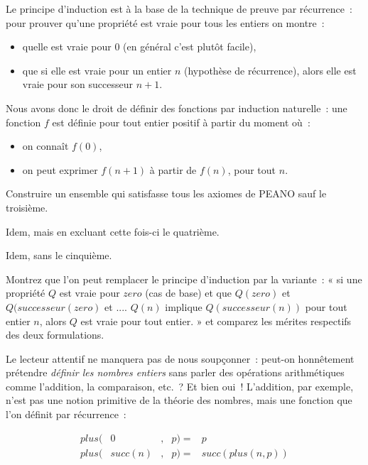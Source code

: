 Le principe d'induction est à la base de la technique de preuve par
récurrence~: pour prouver qu'une propriété est vraie pour tous les
entiers on montre~:
\begin{itemize}
	\item quelle est vraie pour $0$ (en général c'est plut\^ot
	facile), \item que si elle est vraie pour un entier $n$
	(hypothèse de récurrence), alors elle est vraie pour son
	successeur $n+1$.
\end{itemize}
Nous avons donc le droit de définir des fonctions par induction naturelle~: une fonction $f$ est définie pour tout entier positif à partir du moment o\`u~:
\begin{itemize}
\item on connaît $f(0)$,
\item on peut exprimer $f(n+1)$ à partir de $f(n)$, pour tout $n$.
\end{itemize}
\begin{exercice} Construire un ensemble qui satisfasse tous les axiomes de PEANO sauf le troisième.
\end{exercice}
\begin{exercice} Idem, mais en excluant cette fois-ci le quatrième.
\end{exercice}
\begin{exercice} Idem, sans le cinquième.
\end{exercice}
\begin{exercice} Montrez que l'on peut remplacer le principe d'induction par la variante~:
	« si une propriété $Q$ est vraie pour $zero$ (cas de base) et que
	 $Q(zero)$ et $Q(successeur(zero)$ et .... $Q(n)$ implique
	 $Q(successeur(n))$ pour tout entier $n$, alors $Q$ est vraie pour
	 tout entier. » et comparez les mérites respectifs des deux
	 formulations.
\end{exercice}
 

Le lecteur attentif ne manquera pas de nous soup\c{c}onner~: peut-on
honn\^etement prétendre \emph{définir les nombres entiers} sans parler des
opérations arithmétiques comme l'addition, la comparaison, etc.~?  Et
bien oui~! L'addition, par exemple, n'est pas une notion primitive de
la théorie des nombres, mais une fonction que l'on définit par
récurrence~:

$$\begin{array}{rcrcl}
	plus ( &0& , 	&p ) =& p \\				
	plus ( &succ(n)& , &	p ) =& succ(  plus (n ,p ) )
\end{array}$$


